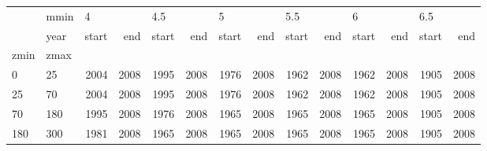 \begin{tabular}{llrrrrrrrrrrrr}
\toprule
    & mmin & \multicolumn{2}{l}{4} & \multicolumn{2}{l}{4.5} & \multicolumn{2}{l}{5} & \multicolumn{2}{l}{5.5} & \multicolumn{2}{l}{6} & \multicolumn{2}{l}{6.5} \\
    & year & start &   end & start &   end & start &   end & start &   end & start &   end & start &   end \\
zmin & zmax &       &       &       &       &       &       &       &       &       &       &       &       \\
\midrule
0   & 25  &  2004 &  2008 &  1995 &  2008 &  1976 &  2008 &  1962 &  2008 &  1962 &  2008 &  1905 &  2008 \\
25  & 70  &  2004 &  2008 &  1995 &  2008 &  1976 &  2008 &  1962 &  2008 &  1962 &  2008 &  1905 &  2008 \\
70  & 180 &  1995 &  2008 &  1976 &  2008 &  1965 &  2008 &  1965 &  2008 &  1965 &  2008 &  1905 &  2008 \\
180 & 300 &  1981 &  2008 &  1965 &  2008 &  1965 &  2008 &  1965 &  2008 &  1965 &  2008 &  1905 &  2008 \\
\bottomrule
\end{tabular}
